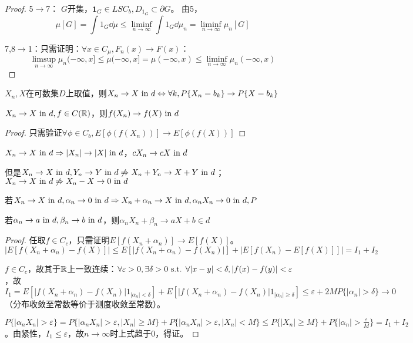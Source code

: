 \documentclass{ctexbook}
\begin{document}
\begin{proof}
  5$\to$7： $G$开集，$\bm{1}_{G}\in LSC_{b},D_{1_{G}}\subset \partial G$。
  由5，\[\mu[G]=\int 1_{G}\dd\mu\leq \liminf_{n\to\infty}\int 1_{G}\dd\mu_{n}=\liminf_{n\to\infty}\mu_{n}[G]\]

  7,8$\to $1：只需证明：$\forall x\in C_{\mu}, F_{n}(x)\to F(x)$：
  \[\limsup_{n\to\infty}\mu_{n}(-\infty,x]\leq \mu(-\infty,x]=\mu(-\infty,x)\leq\liminf\limits_{n\to\infty}\mu_{n}(-\infty,x)\]
\end{proof}

\begin{Eg}
  $X_{n},X$在可数集$D$上取值，则$X_{n}\to X\text{ in } d\Leftrightarrow \forall k, P\{X_{n}=b_{k}\}\to P\{X=b_{k}\}$
\end{Eg}

\begin{Eg}
  $X_{n}\to X\text{ in } d,f\in C(\mathbb{R})$，则$f(X_{n})\to f(X)\text{ in } d$
\end{Eg}
\begin{proof}
  只需验证$\forall \phi\in C_{b}, E[\phi(f(X_{n}))]\to E[\phi(f(X))]$
\end{proof}

\begin{Eg}
  $X_{n}\to X\text{ in } d\Rightarrow |X_{n}|\to |X|\text{ in } d$，$cX_{n}\to cX\text{ in } d$

  但是$X_{n}\to X\text{ in } d,Y_{n}\to Y\text{ in } d\not\Rightarrow X_{n}+Y_{n}\to X+Y\text{ in } d$；$X_{n}\to X\text{ in } d\not\Rightarrow X_{n}-X\to 0\text{ in } d$
\end{Eg}
\begin{Eg}
  若$X_{n}\to X\text{ in } d,\alpha_{n}\to 0\text{ in } d\Rightarrow X_{n}+\alpha_{n}\to X\text{ in } d, \alpha_{n}X_{n}\to 0\text{ in } d,P$

  若$\alpha_{n}\to a\text{ in } d,\beta_{n}\to b\text{ in } d$，则$\alpha_{n}X_{n}+\beta_{n}\to aX+b\in d$
\end{Eg}

\begin{proof}
任取$f\in C_{c}$，只需证明$E[f(X_{n}+\alpha_{n})]\to E[f(X)]$。$|E[f(X_{n}+\alpha_{n})-f(X)]|\leq E[|f(X_{n}+\alpha_{n})-f(X_{n})|]+|E[f(X_{n})-E[f(X)]]|=I_{1}+I_{2}$

$f\in C_{c}$，故其于$\mathbb{R}$上一致连续：$\forall\varepsilon>0,\exists \delta>0\text{ s.t. }\forall|x-y|<\delta,|f(x)-f(y)|<\varepsilon$，故$I_{1}=E[|f(X_{n}+\alpha_{n})-f(X_{n})|1_{|\alpha_{n}|<\delta}]+E[|f(X_{n}+\alpha_{n})-f(X_{n})|1_{|\alpha_{n}|\geq\delta}]\leq \varepsilon+2MP\{|\alpha_{n}|>\delta\}\to 0$（分布收敛至常数等价于测度收敛至常数）。

$P\{|\alpha_{n}X_{n}|>\varepsilon\}=P\{|\alpha_{n}X_{n}|>\varepsilon,|X_{n}|\geq M\}+P\{|\alpha_{n}X_{n}|>\varepsilon, |X_{n}|<M\}\leq P\{|X_{n}|\geq M\}+P\{|\alpha_{n}|>\frac{\varepsilon}{M}\}=I_{1}+I_{2}$。由紧性，$I_{1}\leq\varepsilon$，故$n\to\infty$时上式趋于0，得证。
\end{proof}
\end{document}

